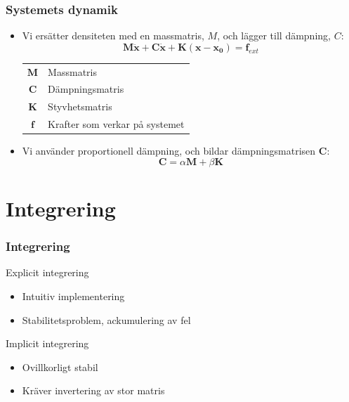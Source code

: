 \documentclass{beamer}
\begin{document}
\begin{frame}
\frametitle{Systemets dynamik}
\begin{itemize}
\item Vi ersätter densiteten med en massmatris, $M$, och lägger till dämpning, $C$:
	\begin{equation}
		\mathbf{M\ddot{x}} + \mathbf{C\dot{x}} + \mathbf{K(x - x_0)}  = \mathbf{f}_{ext}
	\end{equation}


\begin{center}
\begin{tabular}{c l}
$\mathbf{M}$ & Massmatris \\
$\mathbf{C}$ & Dämpningsmatris \\
$\mathbf{K}$ & Styvhetsmatris\\
$\mathbf{f}$ & Krafter som verkar på systemet \\
\end{tabular}
\end{center}
\item Vi använder proportionell dämpning, och bildar dämpningsmatrisen $\mathbf{C}$: 
	\begin{equation}
		\mathbf{C} = \alpha \mathbf{M} + \beta \mathbf{K}
	\end{equation}

\end{itemize}
\end{frame}

\section{Integrering}
\begin{frame}
\frametitle{Integrering}
\begin{block}{Explicit integrering}
\begin{itemize}
\item Intuitiv implementering
\item Stabilitetsproblem, ackumulering av fel
\end{itemize}
\end{block}

\begin{block}{Implicit integrering}
\begin{itemize}
\item Ovillkorligt stabil
\item Kräver invertering av stor matris
\end{itemize}
\end{block}

\end{frame}
\end{document}
